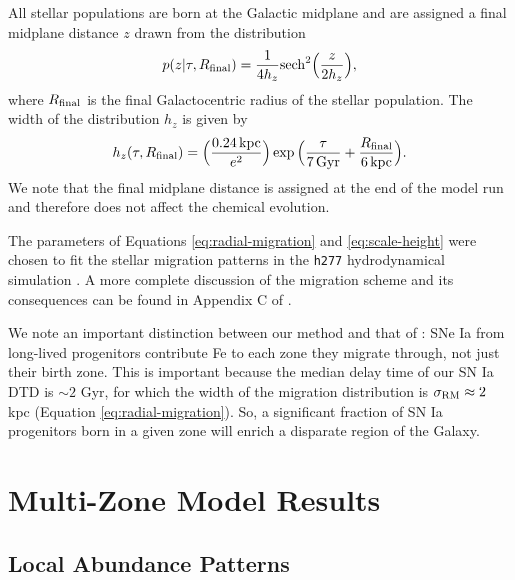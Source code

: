 \documentclass[twocolumn,twocolappendix,linenumbers]{aastex631}
\begin{document}
All stellar populations are born at the Galactic midplane and are assigned a final midplane distance $z$ drawn from the distribution
\begin{equation}
    p(z|\tau,R_{\rm final}) = \frac{1}{4 h_z} {\rm sech}^2\Big(\frac{z}{2 h_z}\Big),
    \label{eq:sech-pdf}
\end{equation}
where $R_{\rm final}$ is the final Galactocentric radius of the stellar population. The width of the distribution $h_z$ is given by
\begin{equation}
    h_z(\tau,R_{\rm final}) = \Big(\frac{0.24\,{\rm kpc}}{e^2}\Big) \exp\Big(\frac{\tau}{7\,{\rm Gyr}} + \frac{R_{\rm final}}{6\,{\rm kpc}}\Big).
    \label{eq:scale-height}
\end{equation}
We note that the final midplane distance is assigned at the end of the model run and therefore does not affect the chemical evolution.

The parameters of Equations \ref{eq:radial-migration} and \ref{eq:scale-height} were chosen to fit the stellar migration patterns in the {\tt h277} hydrodynamical simulation \citep{christensen_implementing_2012}. A more complete discussion of the migration scheme and its consequences can be found in Appendix C of \citet{dubay_galactic_2024}.

We note an important distinction between our method and that of \citet{spitoni_effect_2015}: SNe Ia from long-lived progenitors contribute Fe to each zone they migrate through, not just their birth zone. This is important because the median delay time of our SN Ia DTD is $\sim2$ Gyr, for which the width of the migration distribution is $\sigma_{\rm RM}\approx2$ kpc (Equation \ref{eq:radial-migration}). So, a significant fraction of SN Ia progenitors born in a given zone will enrich a disparate region of the Galaxy.

\section{Multi-Zone Model Results}
\label{sec:multizone-results}

\subsection{Local Abundance Patterns}
\label{sec:abundance-distributions}
\end{document}
